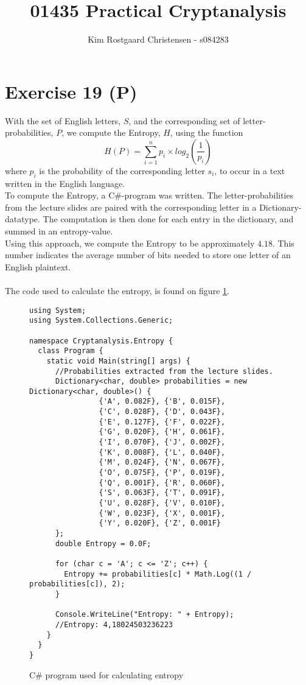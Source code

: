 \documentclass[12pt]{article}
\title{01435 Practical Cryptanalysis}
\author{Kim Rostgaard Christensen - s084283}
\begin{document}
\maketitle
 

\section{Exercise 19 (P)}

With the set of English letters, $S$, and the corresponding set of letter-probabilities, $P$, we compute the Entropy, $H$, using the function\\

\begin{equation}
H(P) = \sum_{i=1}^{n} p_i \times log_2(\frac{1}{p_i})
\end{equation}
where $p_i$ is the probability of the corresponding letter $s_i$, to occur in a text written in the English language.\\
To compute the Entropy, a C\#-program was written. The letter-probabilities from the lecture slides are paired with the corresponding letter in a Dictionary-datatype. The computation is then done for each entry in the dictionary, and summed in an entropy-value.\\
Using this approach, we compute the Entropy to be approximately $4.18$. This number indicates the average number of bits needed to store one letter of an English plaintext. \\\\
The code used to calculate the entropy, is found on figure \ref{lst:code}.

\begin{figure}

\begin{lstlisting}
using System;
using System.Collections.Generic;

namespace Cryptanalysis.Entropy {
  class Program {
    static void Main(string[] args) {
      //Probabilities extracted from the lecture slides.
      Dictionary<char, double> probabilities = new Dictionary<char, double>() {
                {'A', 0.082F}, {'B', 0.015F},
                {'C', 0.028F}, {'D', 0.043F},
                {'E', 0.127F}, {'F', 0.022F},
                {'G', 0.020F}, {'H', 0.061F},
                {'I', 0.070F}, {'J', 0.002F},
                {'K', 0.008F}, {'L', 0.040F},
                {'M', 0.024F}, {'N', 0.067F},
                {'O', 0.075F}, {'P', 0.019F},
                {'Q', 0.001F}, {'R', 0.060F},
                {'S', 0.063F}, {'T', 0.091F},
                {'U', 0.028F}, {'V', 0.010F},
                {'W', 0.023F}, {'X', 0.001F},
                {'Y', 0.020F}, {'Z', 0.001F}
      };
      double Entropy = 0.0F;

      for (char c = 'A'; c <= 'Z'; c++) {
        Entropy += probabilities[c] * Math.Log((1 / probabilities[c]), 2);
      }

      Console.WriteLine("Entropy: " + Entropy);
      //Entropy: 4,18024503236223
    }
  }
}
\end{lstlisting}
\label{lst:code}
\caption{C\# program used for calculating entropy}
\end{figure}
\end{document}
